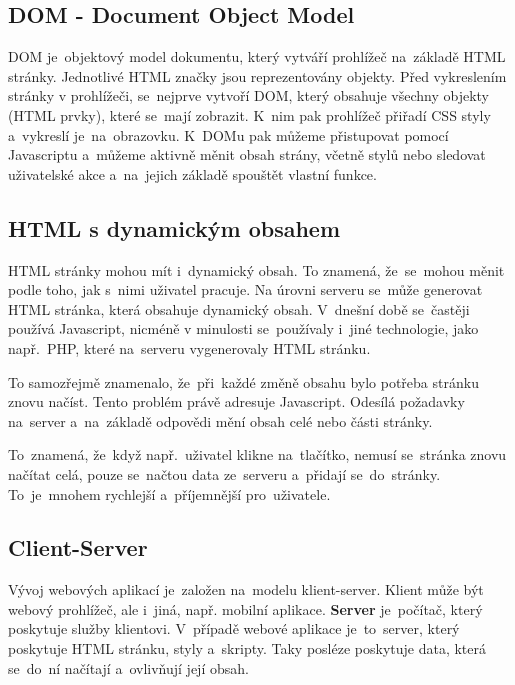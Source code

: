 \documentclass[14pt]{article}
\begin{document}
        \subsection{DOM - Document Object Model}
        DOM je~objektový model dokumentu, který vytváří prohlížeč na~základě HTML stránky. Jednotlivé HTML značky jsou reprezentovány objekty.
        Před vykreslením stránky v prohlížeči, se~nejprve vytvoří DOM, který obsahuje všechny objekty (HTML prvky), které se~mají zobrazit.
        K~nim pak prohlížeč přiřadí CSS styly a~vykreslí je~na~obrazovku. K~DOMu pak můžeme přistupovat pomocí Javascriptu
        a~můžeme aktivně měnit obsah strány, včetně stylů nebo sledovat uživatelské akce a~na~jejich základě spouštět vlastní funkce.\parencite[2.1.01]{kantor_javascript}
        
        \subsection{HTML s dynamickým obsahem}
        HTML stránky mohou mít i~dynamický obsah. To znamená, že~se~mohou měnit podle toho, jak s~nimi uživatel pracuje.
        Na úrovni serveru se~může generovat HTML stránka, která obsahuje dynamický obsah. V~dnešní době se~častěji používá Javascript,
        nicméně v minulosti se~používaly i~jiné technologie, jako např.~PHP, které na~serveru vygenerovaly HTML stránku.

        To samozřejmě znamenalo, že~při~každé změně obsahu bylo potřeba stránku znovu načíst. Tento problém právě adresuje Javascript.
        Odesílá požadavky na~server a~na~základě odpovědi mění obsah celé nebo části stránky.

        To~znamená, že~když např.~uživatel klikne na~tlačítko, nemusí se~stránka znovu načítat celá, pouze se~načtou data ze~serveru
        a~přidají se~do~stránky. To~je~mnohem rychlejší a~příjemnější pro~uživatele.
        
        \subsection{Client-Server}
        Vývoj webových aplikací je~založen na~modelu klient-server. Klient může být webový prohlížeč, ale i~jiná, např. mobilní aplikace.
        \textbf{Server} je~počítač, který poskytuje služby klientovi. V~případě webové aplikace je~to~server, který poskytuje HTML stránku, styly a~skripty.
        Taky posléze poskytuje data, která se~do~ní načítají a~ovlivňují její obsah.
\end{document}
